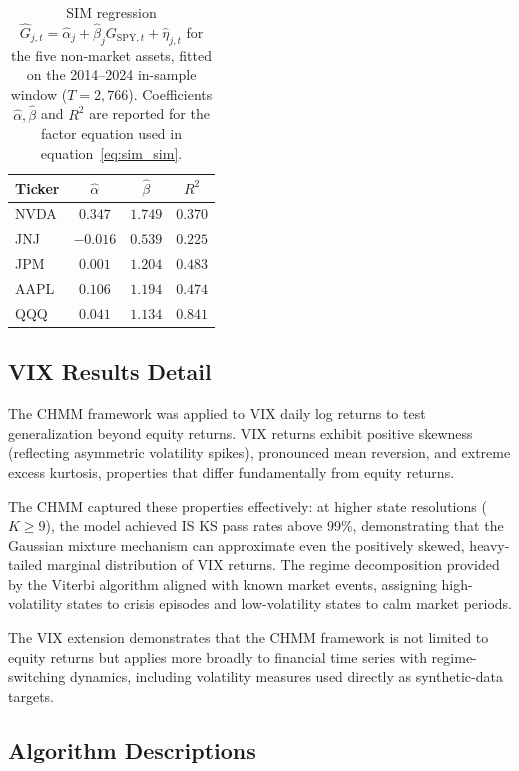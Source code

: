 \begin{table}[H]
\centering
\caption{SIM regression $\hat{G}_{j,t} = \hat{\alpha}_j + \hat{\beta}_j G_{\text{SPY},t} + \hat{\eta}_{j,t}$ for the five non-market assets, fitted on the 2014--2024 in-sample window ($T = 2{,}766$). Coefficients $\hat{\alpha}, \hat{\beta}$ and $R^2$ are reported for the factor equation used in equation~\eqref{eq:sim_sim}.}
\label{tab:sim_regression}
\small
\begin{tabular}{l ccc}
\toprule
Ticker & $\hat{\alpha}$ & $\hat{\beta}$ & $R^2$ \\
\midrule
NVDA & $0.347$   & $1.749$ & $0.370$ \\
JNJ  & $-0.016$  & $0.539$ & $0.225$ \\
JPM  & $0.001$   & $1.204$ & $0.483$ \\
AAPL & $0.106$   & $1.194$ & $0.474$ \\
QQQ  & $0.041$   & $1.134$ & $0.841$ \\
\bottomrule
\end{tabular}
\end{table}

\subsection{VIX Results Detail}

The CHMM framework was applied to VIX daily log returns to test generalization beyond equity returns.
VIX returns exhibit positive skewness (reflecting asymmetric volatility spikes), pronounced mean reversion, and extreme excess kurtosis, properties that differ fundamentally from equity returns.

The CHMM captured these properties effectively: at higher state resolutions ($K \geq 9$), the model achieved IS KS pass rates above 99\%, demonstrating that the Gaussian mixture mechanism can approximate even the positively skewed, heavy-tailed marginal distribution of VIX returns.
The regime decomposition provided by the Viterbi algorithm aligned with known market events, assigning high-volatility states to crisis episodes and low-volatility states to calm market periods.

The VIX extension demonstrates that the CHMM framework is not limited to equity returns but applies more broadly to financial time series with regime-switching dynamics, including volatility measures used directly as synthetic-data targets.

\subsection{Algorithm Descriptions}
\label{sec:algorithms}

